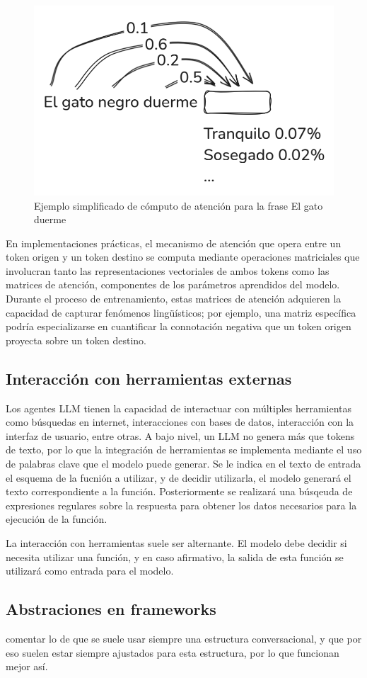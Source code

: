 \begin{figure}
    \centering
    \includegraphics[width=0.65\linewidth]{figures/atencion_poc.png}
    \caption{Ejemplo simplificado de cómputo de atención para la frase \textquotedbl El gato duerme\textquotedbl}
    \label{fig:atencion_gato}
\end{figure}

En implementaciones prácticas, el mecanismo de atención que opera entre un token origen y un token destino se computa mediante operaciones matriciales que involucran tanto las representaciones vectoriales de ambos tokens como las matrices de atención, componentes de los parámetros aprendidos del modelo. Durante el proceso de entrenamiento, estas matrices de atención adquieren la capacidad de capturar fenómenos lingüísticos; por ejemplo, una matriz específica podría especializarse en cuantificar la connotación negativa que un token origen proyecta sobre un token destino.

\subsection{Interacción con herramientas externas}
Los agentes LLM tienen la capacidad de interactuar con múltiples herramientas como búsquedas en internet, interacciones con bases de datos, interacción con la interfaz de usuario, entre otras. A bajo nivel, un LLM no genera más que tokens de texto, por lo que la integración de herramientas se implementa mediante el uso de palabras clave que el modelo puede generar. Se le indica en el texto de entrada el esquema de la fucnión a utilizar, y de decidir utilizarla, el modelo generará el texto correspondiente a la función. Posteriormente se realizará una búsqeuda de expresiones regulares sobre la respuesta para obtener los datos necesarios para la ejecución de la función. 

La interacción con herramientas suele ser alternante. El modelo debe decidir si necesita utilizar una función, y en caso afirmativo, la salida de esta función se utilizará como entrada para el modelo. 

\subsection{Abstraciones en frameworks}
comentar lo de que se suele usar siempre una estructura conversacional, y que por eso suelen estar siempre ajustados para esta estructura, por lo que funcionan mejor así.










